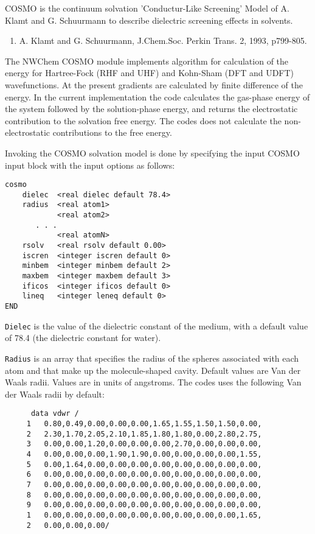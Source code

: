 \label{sec:cosmo}

COSMO is the continuum solvation 'Conductur-Like Screening' Model 
of A. Klamt and G. Schuurmann to describe dielectric screening
effects in solvents.

\begin{enumerate}
\item A. Klamt and G. Schuurmann, J.Chem.Soc. Perkin Trans. 2, 1993,
p799-805.
\end{enumerate}

The NWChem COSMO module implements algorithm for calculation of the
energy for Hartree-Fock (RHF and UHF) and Kohn-Sham (DFT and UDFT)
wavefunctions. At the present gradients are calculated by finite
difference of the energy. In the current implementation the code
calculates the gas-phase energy of the system followed by the
solution-phase energy, and returns the electrostatic contribution
to the solvation free energy. The codes does not calculate the
non-electrostatic contributions to the free energy.

Invoking the COSMO solvation model is done by specifying the input
COSMO input block with the input options as follows:

\begin{verbatim}
cosmo
    dielec  <real dielec default 78.4>
    radius  <real atom1>
            <real atom2>
       . . .
            <real atomN>
    rsolv   <real rsolv default 0.00>
    iscren  <integer iscren default 0>
    minbem  <integer minbem default 2>
    maxbem  <integer maxbem default 3>
    ificos  <integer ificos default 0>
    lineq   <integer leneq default 0>
END
\end{verbatim}

\verb+Dielec+ is the value of the dielectric constant of the medium, 
with a default value of 78.4 (the dielectric constant for water).

\verb+Radius+ is an array that specifies the radius of the spheres
associated with each atom and that make up the molecule-shaped cavity.
Default values are Van der Waals radii. Values are in units of angstroms.
The codes uses the following Van der Waals radii by default:

\begin{verbatim}
      data vdwr /
     1   0.80,0.49,0.00,0.00,0.00,1.65,1.55,1.50,1.50,0.00,
     2   2.30,1.70,2.05,2.10,1.85,1.80,1.80,0.00,2.80,2.75,
     3   0.00,0.00,1.20,0.00,0.00,0.00,2.70,0.00,0.00,0.00,
     4   0.00,0.00,0.00,1.90,1.90,0.00,0.00,0.00,0.00,1.55,
     5   0.00,1.64,0.00,0.00,0.00,0.00,0.00,0.00,0.00,0.00,
     6   0.00,0.00,0.00,0.00,0.00,0.00,0.00,0.00,0.00,0.00,
     7   0.00,0.00,0.00,0.00,0.00,0.00,0.00,0.00,0.00,0.00,
     8   0.00,0.00,0.00,0.00,0.00,0.00,0.00,0.00,0.00,0.00,
     9   0.00,0.00,0.00,0.00,0.00,0.00,0.00,0.00,0.00,0.00,
     1   0.00,0.00,0.00,0.00,0.00,0.00,0.00,0.00,0.00,1.65,
     2   0.00,0.00,0.00/
\end{verbatim}

